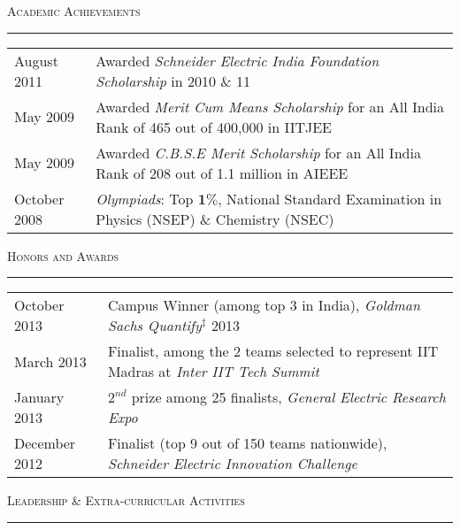 \documentclass[8pt,a4paper,English]{article}
\newcommand{\lv}{\color{table-border}\vrule}
\newcommand\roottitle[1]{ \vspace{3mm} \noindent \textsc{ \normalsize #1} \vspace{1.5mm} \nopagebreak[4] \color{gray} \hrule \color{black} \vspace{2mm} \noindent \small }
\begin{document}
{%

\roottitle{Academic Achievements}
\renewcommand{\arraystretch}{1.2}
\setlength\tabcolsep{8pt}
\begin{tabularx}{\textwidth}{ R{2.6cm} !{\lv} X }
  August 2011  & Awarded \textit{ Schneider Electric India Foundation Scholarship } in 2010 \& 11 \\
  May 2009     & Awarded \textit{Merit Cum Means Scholarship} for an All India Rank of 465 out of 400,000 in IITJEE \\
  May 2009	   & Awarded \textit{C.B.S.E Merit Scholarship} for an All India Rank of 208 out of 1.1 million in AIEEE \\
  October 2008 & \textit{Olympiads}: Top $\bm{1\%}$, National Standard Examination in Physics (NSEP) \& Chemistry (NSEC) \\
\end{tabularx}


\roottitle{Honors and Awards}
\renewcommand{\arraystretch}{1.2}
\setlength\tabcolsep{8pt}
\begin{tabularx}{\textwidth}{ R{2.6cm} !{\lv} X }
    October 2013    & Campus Winner (among top {3} in India), \textit{Goldman Sachs Quantify}$^\ddag$ 2013 \\ %
	March 2013		& Finalist, among the 2 teams selected to represent IIT Madras at \textit{Inter IIT Tech Summit} \\
    January 2013    & $2^{nd}$ prize among 25 finalists, \textit{General Electric Research Expo} \\ 
    December 2012   & Finalist (top 9 out of 150 teams nationwide), \textit{Schneider Electric Innovation Challenge} \\
\end{tabularx}


\roottitle{Leadership \& Extra-curricular Activities}
\renewcommand{\arraystretch}{1.2}
\setlength\tabcolsep{8pt}
\begin{tabularx}{\textwidth}{ r !{\lv} X }


\end{tabularx}}
\end{document}
